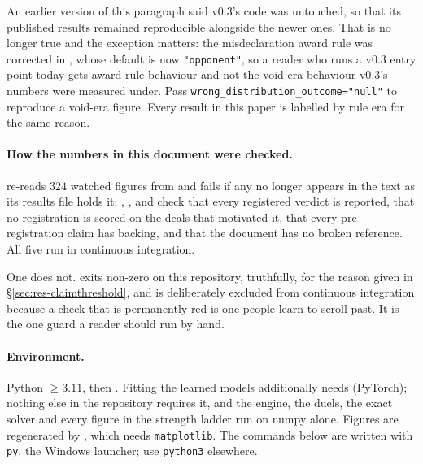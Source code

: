 \documentclass[11pt,letterpaper]{article}
\begin{document}
An earlier version of this paragraph said v0.3's code was untouched, so that
its published results remained reproducible alongside the newer ones. That is
no longer true and the exception matters: the misdeclaration award rule was
corrected in , whose default is now
\texttt{"opponent"}, so a reader who runs a v0.3 entry point today gets
award-rule behaviour and not the void-era behaviour v0.3's numbers were
measured under. Pass \texttt{wrong\_distribution\_outcome="null"} to
reproduce a void-era figure. Every result in this paper is labelled by rule era
for the same reason.

\paragraph{How the numbers in this document were checked.}
 re-reads $324$ watched figures from
 and fails if any no longer appears in the text as its results
file holds it; ,
,  and
 check that every registered verdict is reported,
that no registration is scored on the deals that motivated it, that every
pre-registration claim has backing, and that the document has no broken
reference. All five run in continuous integration.

One does not.  exits non-zero on
this repository, truthfully, for the reason given in \S\ref{sec:res-claimthreshold},
and is deliberately excluded from continuous integration because a check that
is permanently red is one people learn to scroll past. It is the one guard a
reader should run by hand.

\paragraph{Environment.} Python $\geq 3.11$, then
. Fitting the
learned models additionally needs  (PyTorch);
nothing else in the repository requires it, and the engine, the duels, the
exact solver and every figure in the strength ladder run on numpy alone.
Figures are regenerated by , which needs
\texttt{matplotlib}. The commands below are written with \texttt{py}, the
Windows launcher; use \texttt{python3} elsewhere.
\end{document}
